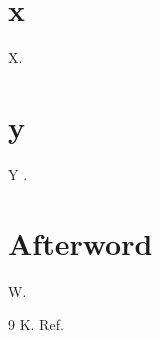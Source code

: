 \documentclass{book}
\begin{document}
\chapter{x}
X.
\chapter{y}
Y \cite{k}.
\backmatter
\chapter{Afterword}
W.
\begin{thebibliography}{9}
 K. Ref.
\end{thebibliography}
\end{document}
